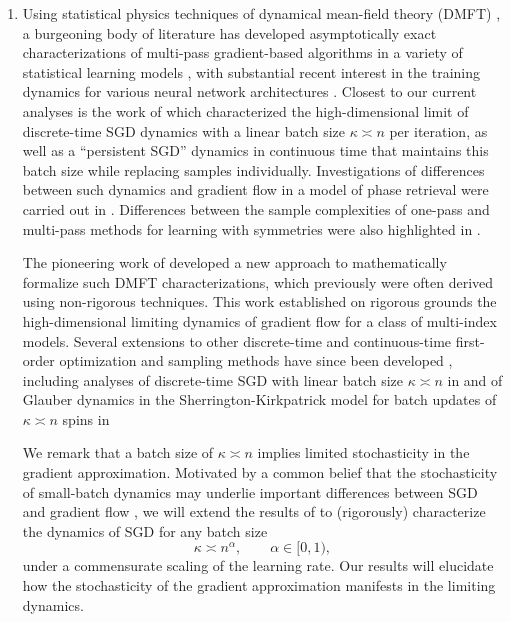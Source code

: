 \documentclass[11pt,letterpaper,reqno]{amsart}
\theoremstyle{definition}
\begin{document}
\begin{enumerate}[1.]
\item Using statistical physics techniques of dynamical mean-field theory (DMFT)
\cite{sompolinsky1981dynamic,sompolinsky1982relaxational,crisanti1993spherical,cugliandolo1993analytical,arous1995large,arous1997symmetric}, a burgeoning body of literature has developed asymptotically exact
characterizations of multi-pass gradient-based algorithms in a variety
of statistical learning models
\cite{sarao2019afraid,mannelli2019passed,sarao2020complex,sarao2020marvels,sarao2021analytical,liang2023high}, with
substantial recent interest in the training dynamics for various neural network
architectures
\cite{bordelon2022self,bordelon2024dynamical,bordelon2024infinite,montanari2025dynamical,han2025precise,martin2026high}.
Closest to our current analyses is the work of \cite{mignacco2021dynamical,mignacco2021stochasticity,mignacco2022effective} which characterized the
high-dimensional limit of discrete-time SGD dynamics with a linear  batch
size $\kappa \asymp n$ per iteration, as well as a ``persistent SGD'' dynamics
in continuous time that maintains this batch size while replacing samples
individually. Investigations of differences between such dynamics and gradient
flow in a model of phase retrieval were
carried out in \cite{mignacco2021stochasticity}. Differences between the sample complexities of
one-pass and multi-pass methods for learning with
symmetries were also highlighted in \cite{lee2024neural,dandi2024benefits}.

The pioneering work of \cite{celentano2021high} developed a new approach
to mathematically formalize such DMFT characterizations, which previously
were often derived
using non-rigorous techniques. This work \cite{celentano2021high} established on rigorous
grounds the high-dimensional limiting dynamics of gradient flow for a 
class of multi-index models. Several extensions to other
discrete-time and continuous-time first-order optimization and sampling methods have since been developed
\cite{gerbelot2024rigorous,han2025entrywise,fan2025dynamical1,fan2025dynamical2,han2025long,chen2025learning,celentano2025state,dandi2025sequential}, including analyses
of discrete-time SGD with linear batch size $\kappa \asymp n$ in \cite{gerbelot2024rigorous}
and of Glauber dynamics in the
Sherrington-Kirkpatrick model for batch updates of $\kappa \asymp n$ spins in \cite{dandi2025sequential}

We remark that a batch size of $\kappa \asymp n$ implies limited stochasticity
in the gradient approximation. Motivated by a common belief that the
stochasticity of small-batch dynamics may underlie important differences between
SGD and gradient flow \cite{keskar2017large,jastrzkebski2017three}, we will extend the
results of \cite{celentano2021high,gerbelot2024rigorous} to (rigorously) characterize the dynamics of SGD for any batch size
\[\kappa \asymp n^\alpha, \qquad \alpha \in [0,1),\]
under a commensurate scaling of the learning rate.
Our results will elucidate how the stochasticity of the gradient approximation
manifests in the limiting dynamics.\\


\end{enumerate}
\end{document}
